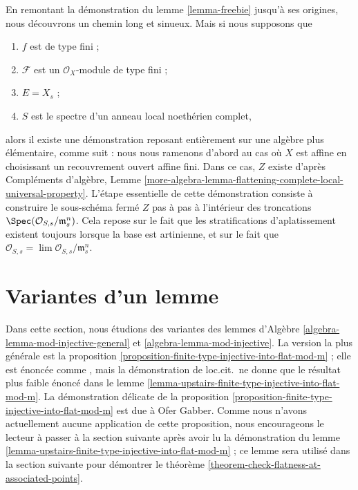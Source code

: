 \begin{remark}
\label{remark-flattening-complete-noetherian}
En remontant la démonstration du
lemme \ref{lemma-freebie}
jusqu'à ses origines, nous découvrons un chemin long et sinueux. Mais si nous supposons que
\begin{enumerate}
\item $f$ est de type fini ;
\item $\mathcal{F}$ est un $\mathcal{O}_X$-module de type fini ;
\item $E = X_s$ ;
\item $S$ est le spectre d'un anneau local noethérien complet,
\end{enumerate}
alors il existe une démonstration reposant entièrement sur une algèbre plus élémentaire,
comme suit : nous nous ramenons d'abord au cas où $X$ est affine en choisissant
un recouvrement ouvert affine fini. Dans ce cas, $Z$ existe d'après
Compléments d'algèbre,
Lemme \ref{more-algebra-lemma-flattening-complete-local-universal-property}.
L'étape essentielle de cette démonstration consiste à construire le sous-schéma fermé $Z$
pas à pas à l'intérieur des troncations
$\Spec(\mathcal{O}_{S, s}/\mathfrak m_s^n)$.
Cela repose sur le fait que les stratifications d'aplatissement existent toujours
lorsque la base est artinienne, et sur le fait que
$\mathcal{O}_{S, s} = \lim \mathcal{O}_{S, s}/\mathfrak m_s^n$.
\end{remark}




\section{Variantes d'un lemme}
\label{section-variants-mod-injective}

\noindent
Dans cette section, nous étudions des variantes des
lemmes d'Algèbre \ref{algebra-lemma-mod-injective-general} et
\ref{algebra-lemma-mod-injective}.
La version la plus générale est la
proposition \ref{proposition-finite-type-injective-into-flat-mod-m} ;
elle est énoncée comme \cite[Lemme 4.2.2]{GruRay}, mais la démonstration de
loc.cit.\ ne donne que le résultat plus faible énoncé dans le
lemme \ref{lemma-upstairs-finite-type-injective-into-flat-mod-m}.
La démonstration délicate de la
proposition \ref{proposition-finite-type-injective-into-flat-mod-m}
est due à Ofer Gabber. Comme nous n'avons actuellement aucune application de
cette proposition, nous encourageons le lecteur à passer à la section suivante
après avoir lu la démonstration du
lemme \ref{lemma-upstairs-finite-type-injective-into-flat-mod-m} ;
ce lemme sera utilisé dans la section suivante pour démontrer le
théorème \ref{theorem-check-flatness-at-associated-points}.

